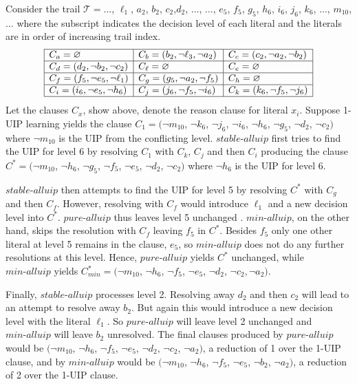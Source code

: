 \documentclass[runningheads]{llncs}
\newcommand{\assertionTrail}{\trail}
\newcommand{\oneuip}{1-UIP\xspace}
\newcommand{\stablealluip}{\textit{stable-alluip}\xspace}
\newcommand{\allUipPure}{\textit{pure-alluip}\xspace}
\newcommand{\allUipMin}{\textit{min-alluip}\xspace}
\newcommand{\trail}{\ensuremath{\mathcal{T}}}
\newcommand{\whitebox}{\raisebox{.5ex}{\fbox{\hspace*{.2ex}}}}
\begin{document}
\vspace*{-3pt}
\begin{example}
    Consider the trail $\assertionTrail = \ldots$, $\ell_1$, $a_2$, $b_2$,
    $c_2$,$d_2$, $\ldots$, $\ldots$, $e_5$, $f_5$, $g_5$,
    $h_6$, $i_6$, $j_6$, $k_6$, $\ldots$, $m_{10}$,
    $\ldots$ where the subscript indicates the decision level of each
    literal and the literals are in order of increasing trail
    index. 
    \[\begin{array}{|l|l|l|}\hline
      C_{a} = \varnothing 
      & C_{b} =  (b_2, \lnot \ell_3, \lnot a_2)
      & C_{c} =  (c_2, \lnot a_2, \lnot b_2) \\\hline
      C_{d} =  (d_2, \lnot b_2, \lnot c_2) 
      & C_{\ell} =\varnothing
      & C_{e} =\varnothing \\\hline
      C_{f} =  (f_5, \lnot e_5,\lnot \ell_1)
      & C_{g} = (g_5, \lnot a_2, \lnot f_5)
      & C_{h} =\varnothing \\\hline
      C_{i} =  (i_6, \lnot e_5, \lnot h_6)
      & C_{j} = (j_6, \lnot f_5, \lnot i_6 )
      & C_{k} = (k_6, \lnot f_5, \lnot j_6) \\\hline
      \end{array}
  \]
  Let the clauses $C_x$, show above, denote the reason clause for
  literal $x_i$.  Suppose \oneuip learning yields the clause
  $C_1 = (\neg{m_{10}}$, $\neg{k_6}$, $\neg{j_6}$, $\neg{i_6}$,
  $\neg{h_6}$, $\neg{g_5}$, $\neg{d_2}$, $\neg{c_2})$ where
  $\neg{m_{10}}$ is the UIP from the conflicting
  level. $\stablealluip$ first tries to find the UIP for level 6 by
  resolving $C_1$ with $C_k$, $C_j$ and then $C_i$ producing the
  clause $C^* = (\neg{m_{10}}$, $\neg{h_6}$, $\neg{g_5}$, $\neg{f_5}$,
  $\neg{e_5}$, $\neg{d_2}$, $\neg{c_2})$ where $\neg{h_6}$ is the UIP
  for level 6.

  $\stablealluip$ then attempts to find the UIP for level 5 by resolving $C^*$
  with $C_g$ and then $C_f$. However, resolving with $C_f$ would
  introduce $\ell_1$ and a new decision level into $C^*$. $\allUipPure$
  thus leaves level 5 unchanged . $\allUipMin$, on the other hand, skips
  the resolution with $C_f$  leaving $f_5$ in $C^*$. Besides $f_5$
  only one other literal at level 5 remains in the clause, $e_5$,
  so $\allUipMin$ does not do any further resolutions at this level. Hence,
  $\allUipPure$ yields $C^*$ unchanged, while $\allUipMin$ yields
  $C^*_{\mathit{min}} = (\neg{m_{10}}$, $\neg{h_6}$, $\neg{f_5}$,
  $\neg{e_5}$, $\neg{d_2}$, $\neg{c_2}, \lnot a_2)$.

  Finally, $\stablealluip$ processes level 2. Resolving away $d_2$ and then
  $c_2$ will lead to an attempt to resolve away $b_2$. But again this
  would introduce a new decision level with the literal $\ell_1$. So
  $\allUipPure$ will leave level 2 unchanged and $\allUipMin$ will leave
  $b_2$ unresolved. The final clauses produced by $\allUipPure$ would be
  $(\neg{m_{10}}$, $\neg{h_6}$, $\neg{f_5}$, $\neg{e_5}$, $\neg{d_2}$,
  $\neg{c_2}$, $\neg{a_2})$, a reduction of 1 over the \oneuip clause,
  and by $\allUipMin$ would be $(\neg{m_{10}}$, $\neg{h_6}$,
  $\neg{f_5}$, $\neg{e_5}$, $\neg{b_2}$, $\neg{a_2})$, a reduction of
  2 over the \oneuip clause.
\whitebox
\end{example}
\end{document}
